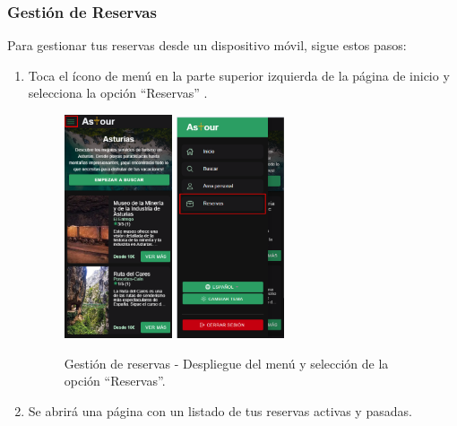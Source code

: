 \subsubsection{Gestión de Reservas}
Para gestionar tus reservas desde un dispositivo móvil, sigue estos pasos:
\begin{enumerate}
	\item Toca el ícono de menú en la parte superior izquierda de la página de inicio y selecciona la opción “Reservas” .
	      \begin{figure}[H]
		      \centering
		      \includegraphics[width=0.3\textwidth]{7-Construccion/Manuales/mobile/menu marcado.png}
		      \includegraphics[width=0.3\textwidth]{7-Construccion/Manuales/mobile/reservas marcado.png}
		      \caption{Gestión de reservas - Despliegue del menú y selección de la opción “Reservas”.}
	      \end{figure}
	\item Se abrirá una página con un listado de tus reservas activas y pasadas.

\end{enumerate}

